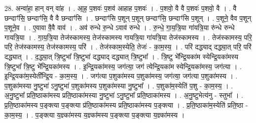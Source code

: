 \documentclass[17pt]{extarticle}
\begin{document}
28. अन्वा॑हा॒ हान् वन् वा॑ह । . आ॒ह॒ प॒शवः॑ प॒शव॑ आहाह प॒शवः॑ । . प॒शवो॒ वै वै प॒शवः॑ प॒शवो॒ वै । . वै छन्दाꣳ॑सि॒ छन्दाꣳ॑सि॒ वै वै छन्दाꣳ॑सि । . छन्दाꣳ॑सि प॒शून् प॒शून् छन्दाꣳ॑सि॒ छन्दाꣳ॑सि प॒शून् । . प॒शूने॒ वैव प॒शून् प॒शूने॒व । . ए॒वावा वै॒वै वाव॑ । . अव॑ रुन्धे रु॒न्धे ऽवाव॑ रुन्धे । . रु॒न्धे॒ गा॒य॒त्रि॒या गा॑यत्रि॒या रु॑न्धे रुन्धे गायत्रि॒या । . गा॒य॒त्रि॒या तेज॑स्कामस्य॒ तेज॑स्कामस्य गायत्रि॒या गा॑यत्रि॒या तेज॑स्कामस्य । . तेज॑स्कामस्य॒ परि॒ परि॒ तेज॑स्कामस्य॒ तेज॑स्कामस्य॒ परि॑ । . तेज॑स्काम॒स्येति॒ तेजः॑ - का॒म॒स्य॒ । . परि॑ दद्ध्याद् दद्ध्या॒त् परि॒ परि॑ दद्ध्यात् । . द॒द्ध्या॒त् त्रि॒ष्टुभा᳚ त्रि॒ष्टुभा॑ दद्ध्याद् दद्ध्यात् त्रि॒ष्टुभा᳚ । . त्रि॒ष्टु भे᳚न्द्रि॒यका॑म स्येन्द्रि॒यका॑मस्य त्रि॒ष्टुभा᳚ त्रि॒ष्टु भे᳚न्द्रि॒यका॑मस्य । . इ॒न्द्रि॒यका॑मस्य॒ जग॑त्या॒ जग॑ त्येन्द्रि॒यका॑म स्येन्द्रि॒यका॑मस्य॒ जग॑त्या । . इ॒न्द्रि॒यका॑म॒स्येती᳚न्द्रि॒य - का॒म॒स्य॒ । . जग॑त्या प॒शुका॑मस्य प॒शुका॑मस्य॒ जग॑त्या॒ जग॑त्या प॒शुका॑मस्य । . प॒शुका॑मस्या नु॒ष्टुभा॑ ऽनु॒ष्टुभा॑ प॒शुका॑मस्य प॒शुका॑मस्या नु॒ष्टुभा᳚ । . प॒शुका॑म॒स्येति॑ प॒शु - का॒म॒स्य॒ । . अ॒नु॒ष्टुभा᳚ प्रति॒ष्ठाका॑मस्य प्रति॒ष्ठाका॑मस्या नु॒ष्टुभा॑ ऽनु॒ष्टुभा᳚ प्रति॒ष्ठाका॑मस्य । . अ॒नु॒ष्टुभेत्य॑नु - स्तुभा᳚ । . प्र॒ति॒ष्ठाका॑मस्य प॒ङ्क्त्या प॒ङ्क्त्या प्र॑ति॒ष्ठाका॑मस्य प्रति॒ष्ठाका॑मस्य प॒ङ्क्त्या । . प्र॒ति॒ष्ठाका॑म॒स्येति॑ प्रति॒ष्ठा - का॒म॒स्य॒ । . प॒ङ्क्त्या य॒ज्ञ्का॑मस्य य॒ज्ञ्का॑मस्य प॒ङ्क्त्या प॒ङ्क्त्या य॒ज्ञ्का॑मस्य । \newline
\end{document}
